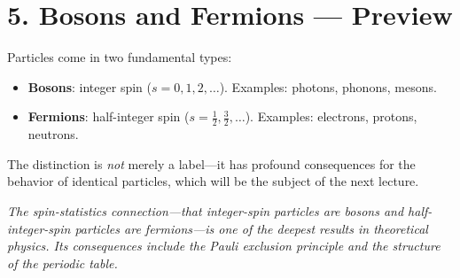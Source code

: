 \documentclass[12pt,a4paper]{article}
\begin{document}
\section{5. Bosons and Fermions --- Preview}

Particles come in two fundamental types:
\begin{itemize}[nosep]
    \item \textbf{Bosons}: integer spin ($s = 0, 1, 2, \ldots$).  Examples: photons, phonons, mesons.
    \item \textbf{Fermions}: half-integer spin ($s = \frac{1}{2}, \frac{3}{2}, \ldots$).  Examples: electrons, protons, neutrons.
\end{itemize}
The distinction is \emph{not} merely a label---it has profound consequences for the behavior of identical particles, which will be the subject of the next lecture.

\medskip
\noindent\textit{The spin-statistics connection---that integer-spin particles are bosons and half-integer-spin particles are fermions---is one of the deepest results in theoretical physics.  Its consequences include the Pauli exclusion principle and the structure of the periodic table.}
\end{document}
